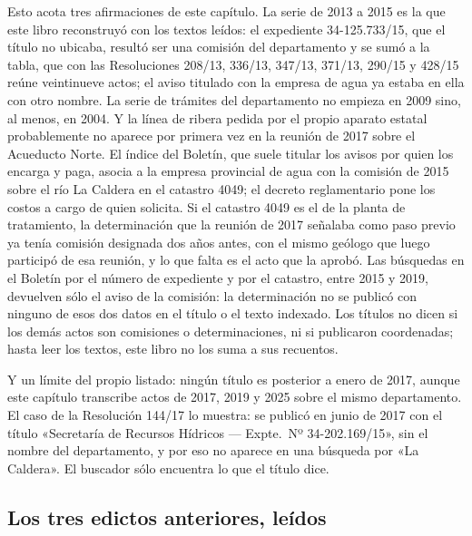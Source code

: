 \begin{cautela}
Esto acota tres afirmaciones de este capítulo. La serie de 2013 a 2015 es la que este libro reconstruyó con los textos leídos: el expediente 34-125.733/15, que el título no ubicaba, resultó ser una comisión del departamento y se sumó a la tabla, que con las Resoluciones 208/13, 336/13, 347/13, 371/13, 290/15 y 428/15 reúne veintinueve actos; el aviso titulado con la empresa de agua ya estaba en ella con otro nombre. La serie de trámites del departamento no empieza en 2009 sino, al menos, en 2004. Y la línea de ribera pedida por el propio aparato estatal probablemente no aparece por primera vez en la reunión de 2017 sobre el Acueducto Norte. El índice del Boletín, que suele titular los avisos por quien los encarga y paga, asocia a la empresa provincial de agua con la comisión de 2015 sobre el río La Caldera en el catastro 4049; el decreto reglamentario pone los costos a cargo de quien solicita. Si el catastro 4049 es el de la planta de tratamiento, la determinación que la reunión de 2017 señalaba como paso previo ya tenía comisión designada dos años antes, con el mismo geólogo que luego participó de esa reunión, y lo que falta es el acto que la aprobó. Las búsquedas en el Boletín por el número de expediente y por el catastro, entre 2015 y 2019, devuelven sólo el aviso de la comisión: la determinación no se publicó con ninguno de esos dos datos en el título o el texto indexado. Los títulos no dicen si los demás actos son comisiones o determinaciones, ni si publicaron coordenadas; hasta leer los textos, este libro no los suma a sus recuentos. 

Y un límite del propio listado: ningún título es posterior a enero de 2017, aunque este capítulo transcribe actos de 2017, 2019 y 2025 sobre el mismo departamento. El caso de la Resolución 144/17 lo muestra: se publicó en junio de 2017 con el título «Secretaría de Recursos Hídricos --- Expte.\ Nº 34-202.169/15», sin el nombre del departamento, y por eso no aparece en una búsqueda por «La Caldera». El buscador sólo encuentra lo que el título dice.
\end{cautela}

\subsection*{Los tres edictos anteriores, leídos}

